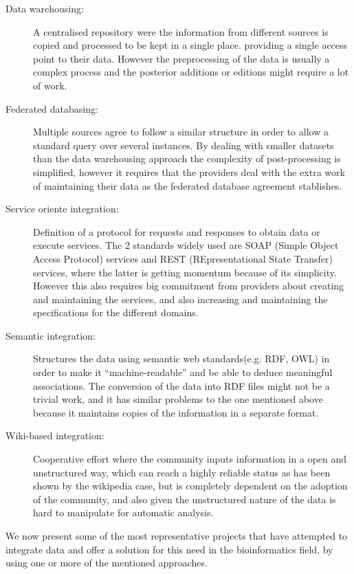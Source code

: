 \begin{description}
\item[Data warehousing:] 			A centralised repository were the information from different sources is copied and processed to be kept  in a single place. providing a single access point to their data. However the preprocessing of the data is usually a complex process and the posterior additions or editions might require a lot of work.
\item[Federated databasing:] 		Multiple sources agree to follow a similar structure in order to allow a standard query over several instances. By dealing with smaller datasets than the data warehousing approach the complexity of post-processing is simplified, however it requires that the providers deal with the extra work of maintaining their data as the federated database agreement stablishes.
\item[Service oriente integration:] 	Definition of a protocol for requests and responses to obtain data or execute services. The 2 standards widely used are SOAP (Simple Object Access Protocol) services and REST (REpresentational State Transfer) services, where the latter is getting momentum because of its simplicity. However this also requires big commitment from providers about creating and maintaining the services, and also increasing and maintaining the specifications for the different domains.
\item[Semantic integration:] 		Structures the data using semantic web standards(e.g. RDF, OWL) in order to make it ``machine-readable'' and be able to deduce meaningful associations. The conversion of the data into RDF files might not be a trivial work, and it has similar problems to the one mentioned above because it maintains copies of the information in a separate format. 
\item[Wiki-based integration:] 		Cooperative effort where the community inputs information in a open and unstructured way, which can reach a highly reliable status as has been shown by the wikipedia case, but is completely dependent on the adoption of the community, and also given the unstructured nature of the data is hard to manipulate for automatic analysis.
\end{description}

We now present some of the most representative projects that have attempted to integrate data and offer a solution for this need in the bioinformatics field, by using one or more of the mentioned approaches. 

